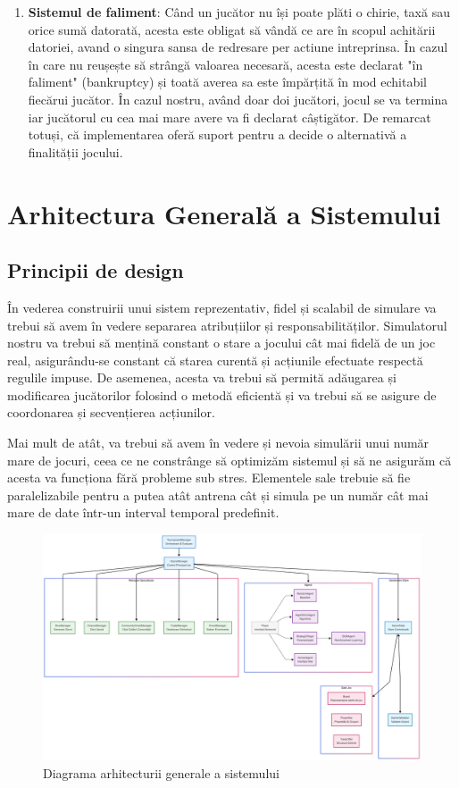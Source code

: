 \begin{enumerate}
    \item \textbf{Sistemul de faliment}: Când un jucător nu își poate plăti o chirie, taxă sau orice sumă datorată, acesta este obligat să vândă ce are în scopul achitării datoriei, avand o singura sansa de redresare per actiune intreprinsa. În cazul în care nu reușește să strângă valoarea necesară, acesta este declarat "în faliment" (bankruptcy) și toată averea sa este împărțită în mod echitabil fiecărui jucător. În cazul nostru, având doar doi jucători, jocul se va termina iar jucătorul cu cea mai mare avere va fi declarat câștigător. De remarcat totuși, că implementarea oferă suport pentru a decide o alternativă a finalității jocului.
\end{enumerate}

\section{Arhitectura Generală a Sistemului}

\subsection{Principii de design}
În vederea construirii unui sistem reprezentativ, fidel și scalabil de simulare va trebui să avem în vedere separarea atribuțiilor și responsabilităților. Simulatorul nostru va trebui să mențină constant o stare a jocului cât mai fidelă de un joc real, asigurându-se constant că starea curentă și acțiunile efectuate respectă regulile impuse. De asemenea, acesta va trebui să permită adăugarea și modificarea jucătorilor folosind o metodă eficientă și va trebui să se asigure de coordonarea și secvențierea acțiunilor.

Mai mult de atât, va trebui să avem în vedere și nevoia simulării unui număr mare de jocuri, ceea ce ne constrânge să optimizăm sistemul și să ne asigurăm că acesta va funcționa fără probleme sub stres. Elementele sale trebuie să fie paralelizabile pentru a putea atât antrena cât și simula pe un număr cât mai mare de date într-un interval temporal predefinit.

\begin{figure}[H]
    \centering
    \includegraphics[width=15cm]{images/diagrama_flow.png}
    \caption{Diagrama arhitecturii generale a sistemului}
    \label{fig:diagrama-responsabilitati}
\end{figure}

